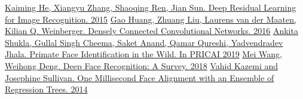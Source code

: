 \documentclass[a4paper,14pt]{extarticle}
\begin{document}
    \begin{thebibliography}{0}
        \hypertarget{resnet}{}
        \href{https://arxiv.org/abs/1512.03385}
        {Kaiming He, Xiangyu Zhang, Shaoqing Ren, Jian Sun. Deep Residual Learning for Image Recognition. 2015}
        \hypertarget{densenet}{}
        \href{https://arxiv.org/abs/1608.06993}
        {Gao Huang, Zhuang Liu, Laurens van der Maaten, Kilian Q. Weinberger. Densely Connected Convolutional Networks. 2016}
        \hypertarget{pfid}{}
        \href{https://arxiv.org/abs/1907.02642}
        {Ankita Shukla, Gullal Singh Cheema, Saket Anand, Qamar Qureshi, Yadvendradev Jhala. Primate Face Identification in the Wild. In PRICAI 2019}
        \hypertarget{face}{}
        \href{https://arxiv.org/abs/1804.06655}
        {Mei Wang, Weihong Deng. Deep Face Recognition: A Survey. 2018}
        \hypertarget{align}{}
        \href{http://www.csc.kth.se/~vahidk/papers/KazemiCVPR14.pdf}
        {Vahid Kazemi and Josephine Sullivan. One Millisecond Face Alignment with an Ensemble of Regression Trees. 2014}
    \end{thebibliography}
\end{document}

